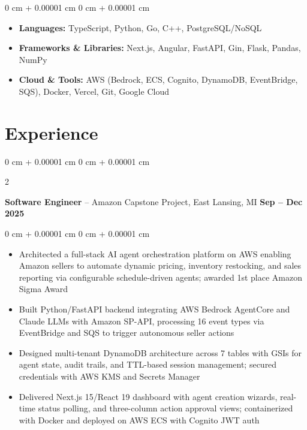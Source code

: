 \documentclass[10pt, letterpaper]{article}
\newenvironment{highlights}{
    \begin{itemize}[
        topsep=0.08 cm,
        parsep=0.08 cm,
        partopsep=0pt,
        itemsep=0pt,
        leftmargin=0 cm + 10pt
    ]
}{
    \end{itemize}
} %
\newenvironment{highlightsforbulletentries}{
    \begin{itemize}[
        topsep=0.08 cm,
        parsep=0.08 cm,
        partopsep=0pt,
        itemsep=0pt,
        leftmargin=10pt
    ]
}{
    \end{itemize}
} %
\newenvironment{onecolentry}{
    \begin{adjustwidth}{
        0 cm + 0.00001 cm
    }{
        0 cm + 0.00001 cm
    }
}{
    \end{adjustwidth}
} %
\newenvironment{twocolentry}[2][]{
    \onecolentry
    \def\secondColumn{#2}
    \setcolumnwidth{\fill, 4.5 cm}
    \begin{paracol}{2}
}{
    \switchcolumn \raggedleft \secondColumn
    \end{paracol}
    \endonecolentry
} %
\begin{document}
    \begin{onecolentry}
        \begin{highlightsforbulletentries}

        \item \textbf{Languages:} TypeScript, Python, Go, C++, PostgreSQL/NoSQL
        
        \item \textbf{Frameworks \& Libraries:} Next.js, Angular, FastAPI, Gin, Flask, Pandas, NumPy
        
        \item \textbf{Cloud \& Tools:} AWS (Bedrock, ECS, Cognito, DynamoDB, EventBridge, SQS), Docker, Vercel, Git, Google Cloud

        \end{highlightsforbulletentries}
    \end{onecolentry}

    
    \section{Experience}
    
        \begin{twocolentry}{
            \textbf{Sep -- Dec 2025}
        }
            \textbf{Software Engineer} -- Amazon Capstone Project, East Lansing, MI\end{twocolentry}

        \vspace{0.08 cm}
        \begin{onecolentry}
            \begin{highlights}

                \item Architected a full-stack AI agent orchestration platform on AWS enabling Amazon sellers to automate dynamic pricing, inventory restocking, and sales reporting via configurable schedule-driven agents; awarded 1st place Amazon Sigma Award

                \item Built Python/FastAPI backend integrating AWS Bedrock AgentCore and Claude LLMs with Amazon SP-API, processing 16 event types via EventBridge and SQS to trigger autonomous seller actions

                \item Designed multi-tenant DynamoDB architecture across 7 tables with GSIs for agent state, audit trails, and TTL-based session management; secured credentials with AWS KMS and Secrets Manager

                \item Delivered Next.js 15/React 19 dashboard with agent creation wizards, real-time status polling, and three-column action approval views; containerized with Docker and deployed on AWS ECS with Cognito JWT auth
            \end{highlights}
        \end{onecolentry}
        
\end{document}
